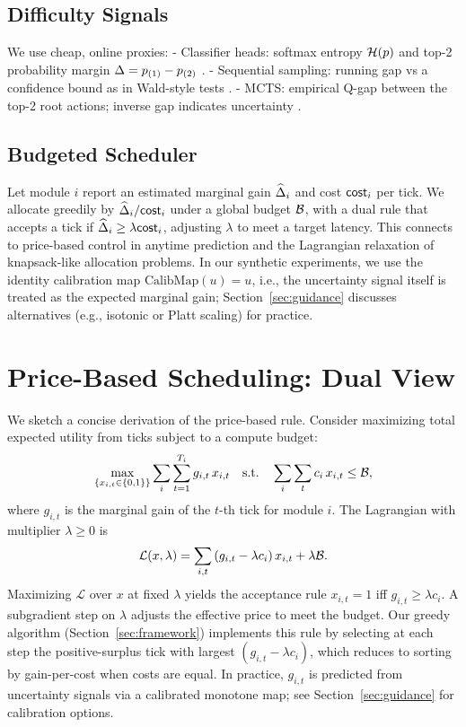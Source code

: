\subsection{Difficulty Signals}
We use cheap, online proxies:
- Classifier heads: softmax entropy $\mathcal{H}(p)$ and top-2 probability margin $\Delta = p_{(1)}-p_{(2)}$ \cite{Kaya2019ShallowDeep,Guo2017Calibration}.
- Sequential sampling: running gap vs a confidence bound as in Wald-style tests \cite{Wald1945Sequential}.
- MCTS: empirical Q-gap between the top-2 root actions; inverse gap indicates uncertainty \cite{Kocsis2006UCT,Coulom2006MCTS}.

\subsection{Budgeted Scheduler}
Let module $i$ report an estimated marginal gain $\widehat{\Delta}_i$ and cost $\mathsf{cost}_i$ per tick. We allocate greedily by $\widehat{\Delta}_i/\mathsf{cost}_i$ under a global budget $\mathcal{B}$, with a dual rule that accepts a tick if $\widehat{\Delta}_i \ge \lambda \mathsf{cost}_i$, adjusting $\lambda$ to meet a target latency. This connects to price-based control in anytime prediction \cite{Graves2016ACT,Anthony2017ThinkingFast} and the Lagrangian relaxation of knapsack-like allocation problems. In our synthetic experiments, we use the identity calibration map $\text{CalibMap}(u)=u$, i.e., the uncertainty signal itself is treated as the expected marginal gain; Section~\ref{sec:guidance} discusses alternatives (e.g., isotonic or Platt scaling) for practice.

\section{Price-Based Scheduling: Dual View}
\label{sec:dual}
We sketch a concise derivation of the price-based rule. Consider maximizing total expected utility from ticks subject to a compute budget:
\begin{equation*}
\max_{\{x_{i,t}\in\{0,1\}\}} \sum_{i} \sum_{t=1}^{T_i} g_{i,t} \, x_{i,t}
\quad\text{s.t.}\quad \sum_{i} \sum_{t} c_i \, x_{i,t} \le \mathcal{B},
\end{equation*}
where $g_{i,t}$ is the marginal gain of the $t$-th tick for module $i$. The Lagrangian with multiplier $\lambda \ge 0$ is
\begin{equation*}
\mathcal{L}(x,\lambda) = \sum_{i,t} \left(g_{i,t} - \lambda c_i\right) x_{i,t} + \lambda \mathcal{B}.
\end{equation*}
Maximizing $\mathcal{L}$ over $x$ at fixed $\lambda$ yields the acceptance rule $x_{i,t}=1$ iff $g_{i,t} \ge \lambda c_i$. A subgradient step on $\lambda$ adjusts the effective price to meet the budget. Our greedy algorithm (Section~\ref{sec:framework}) implements this rule by selecting at each step the positive-surplus tick with largest $(g_{i,t}-\lambda c_i)$, which reduces to sorting by gain-per-cost when costs are equal. In practice, $g_{i,t}$ is predicted from uncertainty signals via a calibrated monotone map; see Section~\ref{sec:guidance} for calibration options.

